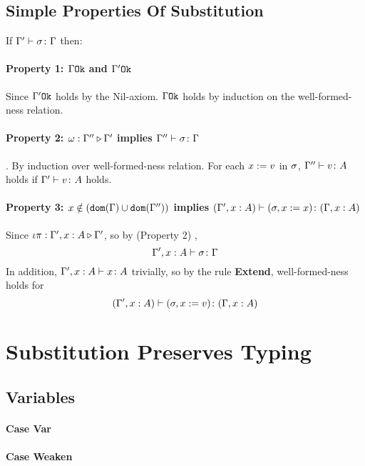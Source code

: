 {    \subsection{Simple Properties Of Substitution}
    If $\Gamma' \vdash \sigma \colon \Gamma$ then:

        \paragraph{Property 1: $\Gamma \texttt{Ok}$ and $\Gamma' \texttt{Ok}$}
         Since $\Gamma' \texttt{Ok}$ holds by the Nil-axiom. $\Gamma \texttt{Ok}$ holds by induction on the well-formed-ness relation.
        \paragraph{Property 2: $\omega : \Gamma'' \triangleright \Gamma'$ implies $\Gamma'' \vdash \sigma \colon \Gamma$}. 
        By induction over well-formed-ness relation. For each $x:= v$ in $\sigma$, $\Gamma'' \vdash v \colon A$ holds if $\Gamma' \vdash v \colon A$ holds.
        \paragraph{Property 3: $x \notin (\texttt{dom}(\Gamma) \cup \texttt{dom}(\Gamma''))$ implies $(\Gamma', x: A) \vdash (\sigma, x := x) \colon (\Gamma, x: A)$} 
        Since $\iota\pi : \Gamma',x: A \triangleright \Gamma'$, so by (Property 2) , 
        $$\Gamma', x: A \vdash \sigma \colon \Gamma$$
        In addition, $\Gamma', x: A \vdash x \colon A$ trivially, so by the rule \textbf{Extend}, well-formed-ness holds for
        \begin{equation}
            (\Gamma', x:A) \vdash (\sigma, x:= v) \colon (\Gamma, x: A)
        \end{equation}
    

    \section{Substitution Preserves Typing}
    
    \subsection{Variables}  
        \paragraph{Case Var}
           
            
        \paragraph{Case Weaken}
           
}
